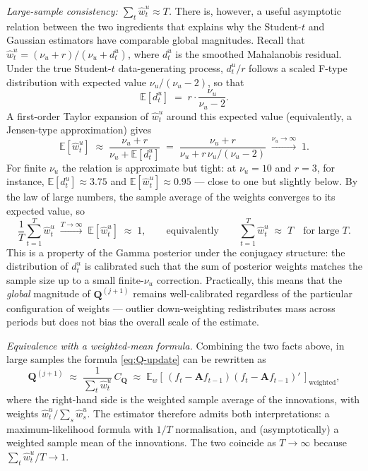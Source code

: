 \documentclass[11pt, a4paper, oneside]{article}
\newcommand{\mA}{\mathbf{A}}
\newcommand{\mQ}{\mathbf{Q}}
\begin{document}
\emph{Large-sample consistency: $\sum_t \hat{w}^u_t \approx T$.}
There is, however, a useful asymptotic relation between the two
ingredients that explains why the Student-$t$ and Gaussian
estimators have comparable global magnitudes. Recall that
$\hat{w}^u_t = (\nu_u + r)/(\nu_u + d^u_t)$, where $d^u_t$ is the
smoothed Mahalanobis residual. Under the true Student-$t$
data-generating process, $d^u_t/r$ follows a scaled F-type
distribution with expected value $\nu_u/(\nu_u - 2)$, so that
\[
\mathbb{E}[d^u_t] \;=\; r \cdot \frac{\nu_u}{\nu_u - 2}.
\]
A first-order Taylor expansion of $\hat{w}^u_t$ around this expected
value (equivalently, a Jensen-type approximation) gives
\[
\mathbb{E}[\hat{w}^u_t]
\;\approx\; \frac{\nu_u + r}{\nu_u + \mathbb{E}[d^u_t]}
\;=\; \frac{\nu_u + r}{\nu_u + r\,\nu_u/(\nu_u - 2)}
\;\xrightarrow{\nu_u \to \infty}\; 1.
\]
For finite $\nu_u$ the relation is approximate but tight: at
$\nu_u = 10$ and $r = 3$, for instance, $\mathbb{E}[d^u_t] \approx 3.75$
and $\mathbb{E}[\hat{w}^u_t] \approx 0.95$ — close to one but slightly
below. By the law of large numbers, the sample average of the weights
converges to its expected value, so
\[
\frac{1}{T}\sum_{t=1}^T \hat{w}^u_t \;\xrightarrow{T \to \infty}\; \mathbb{E}[\hat{w}^u_t]
\;\approx\; 1,
\qquad \text{equivalently} \qquad
\sum_{t=1}^T \hat{w}^u_t \;\approx\; T \quad \text{for large } T.
\]
This is a property of the Gamma posterior under the conjugacy
structure: the distribution of $d^u_t$ is calibrated such that the
sum of posterior weights matches the sample size up to a small
finite-$\nu_u$ correction. Practically, this means that the
\emph{global} magnitude of $\mQ^{(j+1)}$ remains well-calibrated
regardless of the particular configuration of weights — outlier
down-weighting redistributes mass across periods but does not bias
the overall scale of the estimate.

\emph{Equivalence with a weighted-mean formula.}
Combining the two facts above, in large samples the formula
\eqref{eq:Q-update} can be rewritten as
\[
\mQ^{(j+1)} \;\approx\; \frac{1}{\sum_t \hat{w}^u_t}\, C_\mQ
\;\approx\; \mathbb{E}_w[\,(f_t - \mA f_{t-1})(f_t - \mA f_{t-1})'\,]_{\text{weighted}},
\]
where the right-hand side is the weighted sample average of the
innovations, with weights $\hat{w}^u_t / \sum_s \hat{w}^u_s$. The
estimator therefore admits both interpretations: a maximum-likelihood
formula with $1/T$ normalisation, and (asymptotically) a weighted
sample mean of the innovations. The two coincide as $T \to \infty$
because $\sum_t \hat{w}^u_t / T \to 1$.
\end{document}
